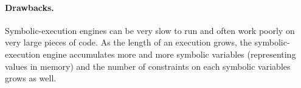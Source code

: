\paragraph{Drawbacks.}
Symbolic-execution engines can be very slow to run and often work
poorly on very large pieces of code. 
As the length of an execution grows, the symbolic-execution engine
accumulates more and more symbolic variables (representing values in memory)
and the number of constraints on each symbolic variables grows as well.


